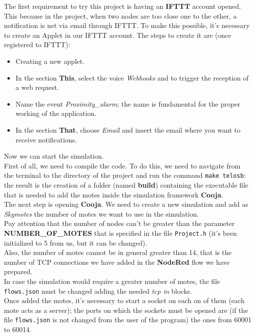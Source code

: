 
The first requirement to try this project is having an \textbf{IFTTT} account opened. This because in the project, when two nodes
are too close one to the other, a notification is net via email through IFTTT. To make this possible, it's necessary to create an
Applet in our IFTTT account. The steps to create it are (once registered to IFTTT):
\begin{itemize}
    \item Creating a new applet.
    \item In the section \textbf{This}, select the voice \textit{Webhooks} and to trigger the reception of a web request.
    \item Name the event \textit{Proximity\_alarm}; the name is fundamental for the proper working of the application.
    \item In the section \textbf{That}, choose \textit{Email} and insert the email where you want to receive notifications.
\end{itemize}
Now we can start the simulation. \\

First of all, we need to compile the code. To do this, we need to navigate from the terminal
to the directory of the project and run the command \texttt{make telosb}: the result is the creation of a folder (named 
\textbf{build}) containing the executable file that is needed to add the motes inside the simulation framework \textbf{Cooja}.\\ 

The next step is opening \textbf{Cooja}. We need to create a new simulation and add as \textit{Skymotes} the number of motes we 
want to use in the simulation.\\ 
Pay attention that the number of nodes can't be greater than the parameter \textbf{NUMBER\_OF\_MOTES}
that is specified in the file \texttt{Project.h} (it's been initialized to 5 from us, but it can be changed).\\ 
Also, the number of motes cannot be in general greater than 14, that is the number of TCP connections we have added in the 
\textbf{NodeRed} flow we have prepared.\\ In case the simulation would require a greater number of motes, the file 
\texttt{flows.json} must be changed adding the needed \textit{tcp in} blocks.\\ 
Once added the motes, it's necessary to start a socket on each on of them (each mote acts as a server); the ports on which the 
sockets must be opened are (if the file \texttt{flows.json} is not changed from the user of the program) the ones from 60001 to 
60014.\\ 

